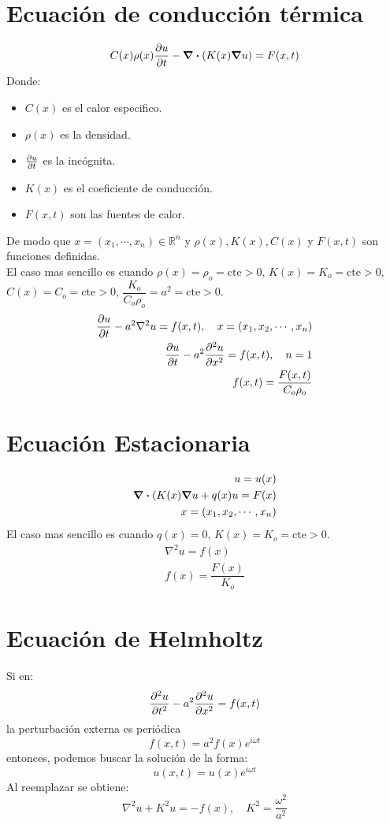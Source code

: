 \documentclass[../main]{subfiles}
\begin{document}
\section*{Ecuación de conducción térmica}
\begin{equation}
    C(x) \rho(x) \pdv{u}{t}-\div{(K(x) \grad{u})}=F(x,t)
\end{equation}
Donde:
\begin{itemize}
    \item $C(x)$ es el calor especifico.
    \item $\rho(x)$ es la densidad.
    \item $\pdv{u}{t}$ es la incógnita.
    \item $K(x)$ es el coeficiente de conducción.
    \item $F(x,t)$ son las fuentes de calor.
\end{itemize}
De modo que $x=(x_1,\cdots, x_n) \in \mathbb{R}^n$ y $\rho(x), K(x), C(x)$ y $F(x,t)$ son funciones definidas. \\[0.2cm]
El caso mas sencillo es cuando $\rho(x)=\rho_o =\text{cte}>0$, $K(x)=K_o=\text{cte}>0$, $C(x)=C_o=\text{cte}>0$, $\dfrac{K_o}{C_o \rho_o}=a^2=\text{cte}>0$.
\begin{align}
    \pdv{u}{t}-a^2 \nabla^2{u}=f(x,t) , \quad x=(x_1,x_2, \cdots, x_n) \\
    \pdv{u}{t}-a^2 \pdv{^2 u}{x^2}=f(x,t) , \quad n=1 \\
    f(x,t)=\dfrac{F(x,t)}{C_o \rho_o}
\end{align}
\section*{Ecuación Estacionaria}
\begin{align}
    u=u(x) \\
    \div{(K(x)\grad{u}}+q(x)u=F(x) \\
    x=(x_1,x_2, \cdots, x_n)
\end{align}
El caso mas sencillo es cuando $q(x)=0$, $K(x)=K_o=\text{cte}>0$.
\begin{align}
    \nabla^2 u=f(x) \tag{Ec. de Poisson} \\
    f(x)=\dfrac{F(x)}{K_o}
\end{align}
\section*{Ecuación de Helmholtz}
Si en:
\begin{equation}
    \pdv{^2 u}{t^2}-a^2 \pdv{^2 u}{x^2}=f(x,t)
\end{equation}
la perturbación externa es periódica
\begin{equation}
    f(x,t)=a^2 f(x) e^{i \omega t}
\end{equation}
entonces, podemos buscar la solución de la forma:
\begin{equation}
    u(x,t)=u(x)e^{i \omega t}
\end{equation}
Al reemplazar se obtiene:
\begin{equation}
    \nabla^2 u+K^2 u=-f(x) , \quad K^2=\dfrac{\omega^2}{a^2}
\end{equation}
\end{document}
